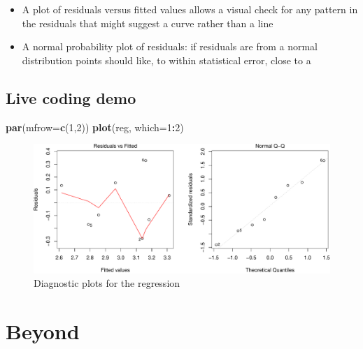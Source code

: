 \documentclass[]{article}
\newenvironment{Shaded}{\begin{snugshade}}{\end{snugshade}}
\newcommand{\DataTypeTok}[1]{\textcolor[rgb]{0.13,0.29,0.53}{#1}}
\newcommand{\DecValTok}[1]{\textcolor[rgb]{0.00,0.00,0.81}{#1}}
\newcommand{\KeywordTok}[1]{\textcolor[rgb]{0.13,0.29,0.53}{\textbf{#1}}}
\newcommand{\NormalTok}[1]{#1}
\newcommand{\OperatorTok}[1]{\textcolor[rgb]{0.81,0.36,0.00}{\textbf{#1}}}
\providecommand{\tightlist}{%
  \setlength{\itemsep}{0pt}\setlength{\parskip}{0pt}}
\begin{document}
\begin{itemize}
\tightlist
\item
  A plot of residuals versus fitted values allows a visual check for any
  pattern in the residuals that might suggest a curve rather than a line
\item
  A normal probability plot of residuals: if residuals are from a normal
  distribution points should like, to within statistical error, close to
  a
\end{itemize}

\hypertarget{live-coding-demo-4}{%
\subsection{Live coding demo}\label{live-coding-demo-4}}

\begin{Shaded}
\begin{Highlighting}[]
\KeywordTok{par}\NormalTok{(}\DataTypeTok{mfrow=}\KeywordTok{c}\NormalTok{(}\DecValTok{1}\NormalTok{,}\DecValTok{2}\NormalTok{))}
\KeywordTok{plot}\NormalTok{(reg, }\DataTypeTok{which=}\DecValTok{1}\OperatorTok{:}\DecValTok{2}\NormalTok{)}
\end{Highlighting}
\end{Shaded}

\begin{figure}[H]

{\centering \includegraphics{session-regression-I-files/figures/unnamed-chunk-7-1} 

}

\caption{Diagnostic plots for the regression}\label{fig:unnamed-chunk-7}
\end{figure}

\hypertarget{beyond}{%
\section{Beyond}\label{beyond}}
\end{document}
